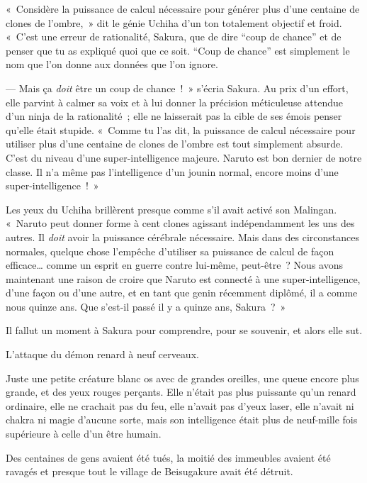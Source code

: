 \clearpage
{}

«~Considère la puissance de calcul nécessaire pour générer plus d'une centaine de clones de l'ombre,~» dit le génie Uchiha d'un ton totalement objectif et froid.
«~C'est une erreur de rationalité, Sakura, que de dire “coup de chance” et de penser que tu as expliqué quoi que ce soit.
“Coup de chance” est simplement le nom que l'on donne aux données que l'on ignore.

--- Mais ça \emph{doit} être un coup de chance~!~»
s'écria Sakura.
Au prix d'un effort, elle parvint à calmer sa voix et à lui donner la précision méticuleuse attendue d'un ninja de la rationalité~; elle ne laisserait pas la cible de ses émois penser qu'elle était stupide.
«~Comme tu l'as dit, la puissance de calcul nécessaire pour utiliser plus d'une centaine de clones de l'ombre est tout simplement absurde.
C'est du niveau d'une super-intelligence majeure.
Naruto est bon dernier de notre classe.
Il n'a même pas l'intelligence d'un jounin normal, encore moins d'une super-intelligence~!~»

Les yeux du Uchiha brillèrent presque comme s'il avait activé son Malingan.
«~Naruto peut donner forme à cent clones agissant indépendamment les uns des autres.
Il \emph{doit} avoir la puissance cérébrale nécessaire.
Mais dans des circonstances normales, quelque chose l'empêche d'utiliser sa puissance de calcul de façon efficace… comme un esprit en guerre contre lui-même, peut-être~?
Nous avons maintenant une raison de croire que Naruto est connecté à une super-intelligence, d'une façon ou d'une autre, et en tant que genin récemment diplômé, il a comme nous quinze ans.
Que s'est-il passé il y a quinze ans, Sakura~?~»

Il fallut un moment à Sakura pour comprendre, pour se souvenir, et alors elle sut.

L'attaque du démon renard à neuf cerveaux.

Juste une petite créature blanc os avec de grandes oreilles, une queue encore plus grande, et des yeux rouges perçants.
Elle n'était pas plus puissante qu'un renard ordinaire, elle ne crachait pas du feu, elle n'avait pas d'yeux laser, elle n'avait ni chakra ni magie d'aucune sorte, mais son intelligence était plus de neuf-mille fois supérieure à celle d'un être humain.

Des centaines de gens avaient été tués, la moitié des immeubles avaient été ravagés et presque tout le village de Beisugakure avait été détruit.

